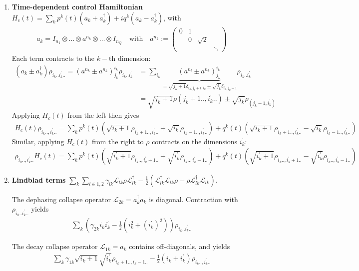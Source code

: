 \documentclass[letterpaper]{article}
\newcommand{\Ell}{\mathcal{L}}
\begin{document}
\begin{enumerate}
    \item \textbf{Time-dependent control Hamiltonian} $H_c(t) = \sum_k p^k(t) (a_k + a_k^\dag) + iq^k(a_k - a_k^\dag)$, with  
      \begin{align}
      a_k = I_{n_1}\otimes \dots \otimes a^{n_k} \otimes \dots \otimes I_{n_Q} \quad \text{with} \quad a^{n_k} := \begin{pmatrix} 0 & 1 & \\ & 0 & \sqrt{2} \\ & & & \ddots \end{pmatrix}
      \end{align}
      Each term contracts to the $k-$th dimension:
      \begin{align}
        (a_k\pm a_k^\dag) \rho_{i_k..i_k^\prime ..} = (a^{n_k} \pm a^{n_k})^{i_k}_{j_k} \rho_{i_k..i_k^\prime} &= \sum_{i_k} \underbrace{(a^{n_l} \pm a^{n_k})_{j_k}^{i_k}}_{= \sqrt{j_k+1} \delta_{i_k,j_k+1,i_{k}} \pm \sqrt{j_k} \delta_{i_k,j_k-1}} \rho_{i_k.. i_k^{\prime}} \\
        &= \sqrt{j_k+1} \rho(j_k+1.., i_k^\prime..) \pm \sqrt{j_k} \rho_(j_k-1, i_k^\prime)
      \end{align} 
      Applying $H_c(t)$ from the left then gives 
      \begin{align}
        H_c(t) \rho_{i_k.., i_k^\prime ..} = \sum_k p^k(t) \left(\sqrt{i_k+1} \rho_{i_k+1..,i_k^\prime..} + \sqrt{i_k} \rho_{i_k-1..,i_k^\prime..} \right) + q^k(t) \left(\sqrt{i_k+1} \rho_{i_k+1..,i_k^\prime..} - \sqrt{i_k} \rho_{i_k-1..,i_k^\prime..} \right)
      \end{align}
      Similar, applying $H_c(t)$ from the right to $\rho$ contracts on the dimensions $i_k^\prime$:
      \begin{align}
        \rho_{i_k.., i_k^\prime ..} H_c(t) = \sum_k p^k(t) \left(\sqrt{i_k^\prime+1} \rho_{i_k..,i_k^\prime+1..} + \sqrt{i_k^\prime} \rho_{i_k..,i_k^\prime-1..} \right) + q^k(t) \left(\sqrt{i_k^\prime+1} \rho_{i_k..,i_k^\prime+1..} - \sqrt{i_k^\prime} \rho_{i_k..,i_k^\prime-1..} \right)
      \end{align}

    \item \textbf{Lindblad terms} $\sum_k \sum_{l\in{1,2}} \gamma_{lk} \Ell_{lk} \rho \Ell_{lk}^\dag - \frac{1}{2} \left( \Ell_{lk}^\dag \Ell_{lk} \rho + \rho \Ell_{lk}^\dag \Ell_{lk}\right)$.
    
    The dephasing collapse operator $\Ell_{2k} = a_k^\dag a_k$ is diagonal. Contraction with $\rho_{i_k..i_k^\prime..}$ yields
    \begin{align}
        \sum_k \left( \gamma_{2k} i_ki_k^\prime - \frac 12 \left( i_k^2 + (i_k^\prime)^2\right) \right) \rho_{i_k..i_k^\prime..}
    \end{align}

    The decay collapse operator $\Ell_{1k} = a_k$ contains off-diagonals, and yields
    \begin{align}
        \sum_k \gamma_{1k} \sqrt{i_k+1}\sqrt{i_k^\prime} \rho_{i_k+1.., i_k-1..} - \frac 12 \left( i_k+ i_k^\prime \right)\rho_{i_k.., i_k^\prime..} 
    \end{align}
      
\end{enumerate}
\end{document}
